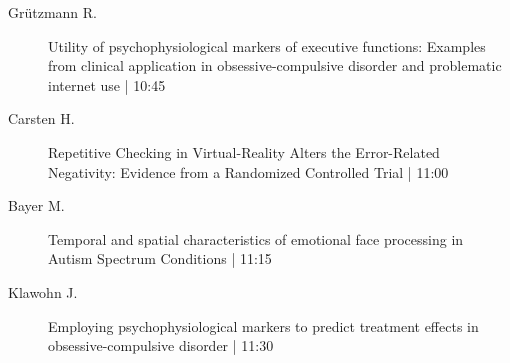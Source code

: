 \begin{symposium}
\begin{description}
                \item [ Grützmann R.] Utility of psychophysiological markers of executive functions: Examples from clinical application in obsessive-compulsive disorder and problematic internet use \textcolor{mygray}{ | 10:45}    
                
                \item [ Carsten H.] Repetitive Checking in Virtual-Reality Alters the Error-Related Negativity: Evidence from a Randomized Controlled Trial \textcolor{mygray}{ | 11:00}    
                
                \item [ Bayer M.] Temporal and spatial characteristics of emotional face processing in Autism Spectrum Conditions \textcolor{mygray}{ | 11:15}    
                
                \item [ Klawohn J.] Employing psychophysiological markers to predict treatment effects in obsessive-compulsive disorder \textcolor{mygray}{ | 11:30}    
                
            \end{description} 
            \end{symposium}
            